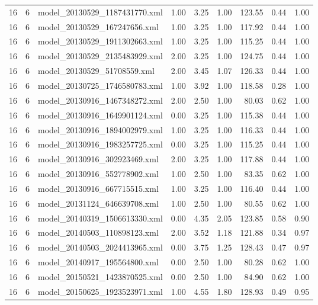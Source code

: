 \begin{table}[ht]
\begin{tabular}{rrlrrrrrr}
   16 &   6 & model\_20130529\_1187431770.xml & 1.00 & 3.25 & 1.00 & 123.55 & 0.44 & 1.00 \\ 
   16 &   6 & model\_20130529\_167247656.xml & 1.00 & 3.25 & 1.00 & 117.92 & 0.44 & 1.00 \\ 
   16 &   6 & model\_20130529\_1911302663.xml & 1.00 & 3.25 & 1.00 & 115.25 & 0.44 & 1.00 \\ 
   16 &   6 & model\_20130529\_2135483929.xml & 2.00 & 3.25 & 1.00 & 124.75 & 0.44 & 1.00 \\ 
   16 &   6 & model\_20130529\_51708559.xml & 2.00 & 3.45 & 1.07 & 126.33 & 0.44 & 1.00 \\ 
   16 &   6 & model\_20130725\_1746580783.xml & 1.00 & 3.92 & 1.00 & 118.58 & 0.28 & 1.00 \\ 
   16 &   6 & model\_20130916\_1467348272.xml & 2.00 & 2.50 & 1.00 & 80.03 & 0.62 & 1.00 \\ 
   16 &   6 & model\_20130916\_1649901124.xml & 0.00 & 3.25 & 1.00 & 115.38 & 0.44 & 1.00 \\ 
   16 &   6 & model\_20130916\_1894002979.xml & 1.00 & 3.25 & 1.00 & 116.33 & 0.44 & 1.00 \\ 
   16 &   6 & model\_20130916\_1983257725.xml & 0.00 & 3.25 & 1.00 & 115.25 & 0.44 & 1.00 \\ 
   16 &   6 & model\_20130916\_302923469.xml & 2.00 & 3.25 & 1.00 & 117.88 & 0.44 & 1.00 \\ 
   16 &   6 & model\_20130916\_552778902.xml & 1.00 & 2.50 & 1.00 & 83.35 & 0.62 & 1.00 \\ 
   16 &   6 & model\_20130916\_667715515.xml & 1.00 & 3.25 & 1.00 & 116.40 & 0.44 & 1.00 \\ 
   16 &   6 & model\_20131124\_646639708.xml & 1.00 & 2.50 & 1.00 & 80.55 & 0.62 & 1.00 \\ 
   16 &   6 & model\_20140319\_1506613330.xml & 0.00 & 4.35 & 2.05 & 123.85 & 0.58 & 0.90 \\ 
   16 &   6 & model\_20140503\_110898123.xml & 2.00 & 3.52 & 1.18 & 121.88 & 0.34 & 0.97 \\ 
   16 &   6 & model\_20140503\_2024413965.xml & 0.00 & 3.75 & 1.25 & 128.43 & 0.47 & 0.97 \\ 
   16 &   6 & model\_20140917\_195564800.xml & 0.00 & 2.50 & 1.00 & 80.28 & 0.62 & 1.00 \\ 
   16 &   6 & model\_20150521\_1423870525.xml & 0.00 & 2.50 & 1.00 & 84.90 & 0.62 & 1.00 \\ 
   16 &   6 & model\_20150625\_1923523971.xml & 1.00 & 4.55 & 1.80 & 128.93 & 0.49 & 0.95 \\ 

\end{tabular}
\end{table}
